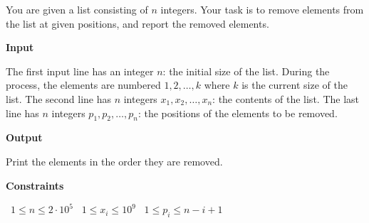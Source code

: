 You are given a list consisting of $n$ integers. Your task is to remove elements from the list at given positions, and report the removed elements.

\vspace{0.3cm}\noindent\textbf{Input}

The first input line has an integer $n$: the initial size of the list. During the process, the elements are numbered $1,2,\dots,k$ where $k$ is the current size of the list.
The second line has $n$ integers $x_1,x_2,\dots,x_n$: the contents of the list.
The last line has $n$ integers $p_1,p_2,\dots,p_n$: the positions of the elements to be removed.

\vspace{0.3cm}\noindent\textbf{Output}

Print the elements in the order they are removed.

\vspace{0.3cm}\noindent\textbf{Constraints}

\textbullet\ $1 \le n \le 2 \cdot 10^5$
\textbullet\ $1 \le x_i \le 10^9$
\textbullet\ $1 \le p_i \le n-i+1$